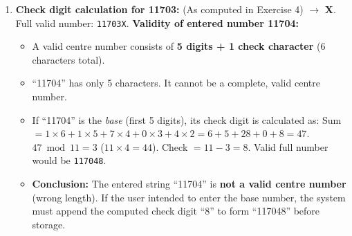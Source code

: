 \documentclass[11pt]{article}
\begin{document}
\begin{corrige}
\begin{enumerate}
\item \textbf{Check digit calculation for 11703:} (As computed in Exercise 4) $\rightarrow$ \textbf{X}. Full valid number: \texttt{11703X}.
\textbf{Validity of entered number 11704:}
\begin{itemize}
\item A valid centre number consists of \textbf{5 digits + 1 check character} (6 characters total).
\item ``11704'' has only 5 characters. It cannot be a complete, valid centre number.
\item If ``11704'' is the \emph{base} (first 5 digits), its check digit is calculated as:
Sum $= 1\times6 + 1\times5 + 7\times4 + 0\times3 + 4\times2 = 6+5+28+0+8 = 47$.
$47 \bmod 11 = 3$ ($11\times4=44$).
Check $= 11 - 3 = 8$.
Valid full number would be \texttt{117048}.
\item \textbf{Conclusion:} The entered string ``11704'' is \textbf{not a valid centre number} (wrong length). If the user intended to enter the base number, the system must append the computed check digit ``8'' to form ``117048'' before storage.
\end{itemize}
\end{enumerate}
\end{corrige}
\end{document}
